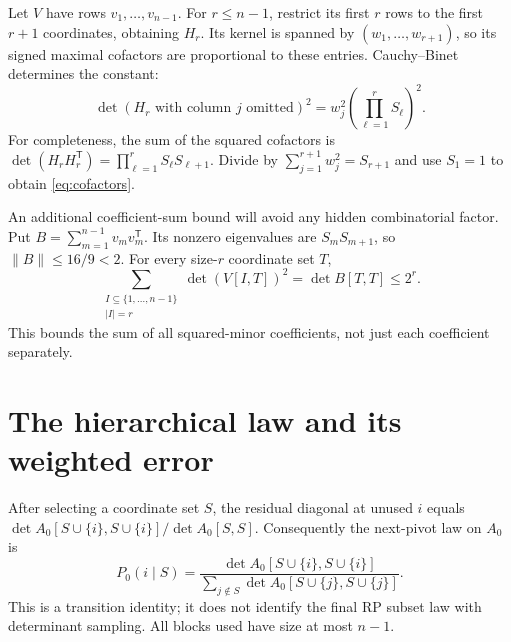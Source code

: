 \documentclass[10pt,letterpaper]{article}
\begin{document}
Let $V$ have rows $v_1,\ldots,v_{n-1}$. For $r\leq n-1$, restrict its
first $r$ rows to the first $r+1$ coordinates, obtaining $H_r$.
Its kernel is spanned by $(w_1,\ldots,w_{r+1})$, so its signed maximal
cofactors are proportional to these entries. Cauchy--Binet determines the
constant:
\begin{equation}\label{eq:cofactors}
 \det(H_r\text{ with column }j\text{ omitted})^2
   =w_j^2\left(\prod_{\ell=1}^r S_\ell\right)^2.
\end{equation}
For completeness, the sum of the squared cofactors is
$\det(H_rH_r^{\mathsf T})=\prod_{\ell=1}^r S_\ell S_{\ell+1}$.
Divide by $\sum_{j=1}^{r+1}w_j^2=S_{r+1}$ and use $S_1=1$ to obtain
\eqref{eq:cofactors}.

An additional coefficient-sum bound will avoid any hidden combinatorial
factor. Put $B=\sum_{m=1}^{n-1}v_mv_m^{\mathsf T}$. Its nonzero
eigenvalues are $S_mS_{m+1}$, so $\|B\|\leq16/9<2$. For every
size-$r$ coordinate set $T$,
\begin{equation}\label{eq:minor-sum}
 \sum_{\substack{I\subseteq\{1,\ldots,n-1\}\\|I|=r}}
       \det(V[I,T])^2
   =\det B[T,T]\leq2^r.
\end{equation}
This bounds the sum of all squared-minor coefficients, not just each
coefficient separately.

\section{The hierarchical law and its weighted error}\label{sec:hierarchy}

After selecting a coordinate set $S$, the residual diagonal at unused
$i$ equals $\det A_0[S\cup\{i\},S\cup\{i\}]/\det A_0[S,S]$.
Consequently the next-pivot law on $A_0$ is
\begin{equation}\label{eq:transition}
 P_0(i\mid S)=\frac{\det A_0[S\cup\{i\},S\cup\{i\}]}
 {\sum_{j\notin S}\det A_0[S\cup\{j\},S\cup\{j\}]}.
\end{equation}
This is a transition identity; it does not identify the final RP subset
law with determinant sampling. All blocks used have size at most $n-1$.
\end{document}
